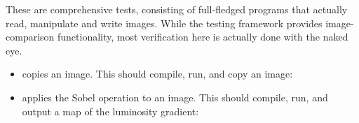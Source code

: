 These are comprehensive tests, consisting of full-fledged programs that actually
read, manipulate and write images. While the testing framework provides image-comparison functionality,
most verification here is actually done with the naked eye.\\

\begin{itemize}

\item{} copies an image. This should compile, run, and copy an image:


\item{} applies the Sobel operation to an image. This should compile, run, and output
a map of the luminosity gradient:


\end{itemize}


